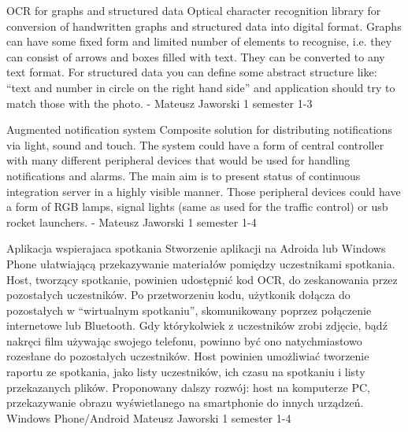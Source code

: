 \begin{project}
{OCR for graphs and structured data}
{Optical character recognition library for conversion of handwritten graphs and structured data into digital format.} 
{ 
Graphs can have some fixed form and limited number of elements to recognise, i.e. 
they can consist of arrows and boxes filled with text. They can be converted to any text format.
 For structured data you can define some abstract structure like: “text and number in circle on the right 
 hand side” and application should try to match those with the photo.
}
{-}
{Mateusz Jaworski}
{1 semester}
{1-3}
\end{project}
\begin{project}
{Augmented notification system}
{Composite solution for distributing notifications via light, sound and touch.}
{
The system could have a form of central controller with many different 
peripheral devices that would be used for handling notifications and alarms. 
The main aim is to present status of continuous integration server in a highly visible manner. 
Those peripheral devices could have a form of RGB lamps, signal lights (same as used for the traffic control) or usb rocket launchers.
}
{-}
{Mateusz Jaworski}
{1 semester}
{1-4}
\end{project}
\begin{project}
{Aplikacja wspierajaca spotkania}
{Stworzenie aplikacji na Adroida lub Windows Phone ułatwiającą przekazywanie
materiałów pomiędzy uczestnikami spotkania.} 
{
Host, tworzący spotkanie, powinien udostępnić kod OCR, do zeskanowania przez
pozostałych uczestników. Po przetworzeniu kodu, użytkonik dołącza do pozostałych 
w “wirtualnym spotkaniu”, skomunikowany poprzez połączenie internetowe lub Bluetooth. 
Gdy którykolwiek z uczestników zrobi zdjęcie, bądź nakręci film używając swojego telefonu, 
powinno być ono natychmiastowo rozesłane do pozostałych uczestników. Host powinien umożliwiać 
tworzenie raportu ze spotkania, jako listy uczestników, ich czasu na spotkaniu i 
listy przekazanych plików. Proponowany dalszy rozwój: host na komputerze PC, 
przekazywanie obrazu wyświetlanego na smartphonie do innych urządzeń. }
{Windows Phone/Android}
{Mateusz Jaworski}
{1 semester}
{1-4}
\end{project}
